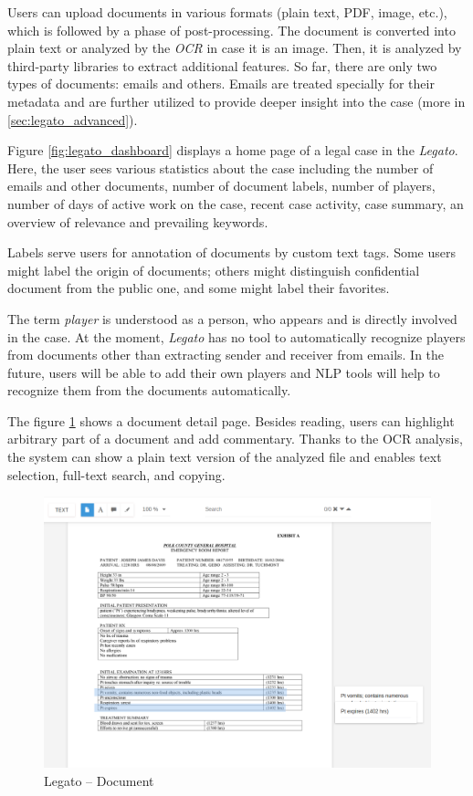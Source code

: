 \documentclass[
  digital, %
  notable,   %
  nolof,     %
  nolot,     %
]{fithesis3}
\begin{document}
Users can upload documents in various formats (plain text, PDF, image, etc.), which is followed by a phase of post-processing.
The document is converted into plain text or analyzed by the \textit{OCR} in case it is an image.
Then, it is analyzed by third-party libraries to extract additional features.
So far, there are only two types of documents: emails and others.
Emails are treated specially for their metadata and are further utilized to provide deeper insight into the case (more in \ref{sec:legato_advanced}).

Figure \ref{fig:legato_dashboard} displays a home page of a legal case in the \textit{Legato}.
Here, the user sees various statistics about the case including the number of emails and other documents, number of document labels, number of players, number of days of active work on the case, recent case activity, case summary, an overview of relevance and prevailing keywords.

Labels serve users for annotation of documents by custom text tags.
Some users might label the origin of documents; others might distinguish confidential document from the public one, and some might label their favorites.

The term \textit{player} is understood as a person, who appears and is directly involved in the case.
At the moment, \textit{Legato} has no tool to automatically recognize players from documents other than extracting sender and receiver from emails.
In the future, users will be able to add their own players and NLP tools will help to recognize them from the documents automatically.

The figure \ref{fig:legato_document} shows a document detail page.
Besides reading, users can highlight arbitrary part of a document and add commentary.
Thanks to the OCR analysis, the system can show a plain text version of the analyzed file and enables text selection, full-text search, and copying.

\begin{figure}[h]
\caption{Legato -- Document}
\label{fig:legato_document}
\includegraphics[width=\textwidth]{img/Legato-File}
\end{figure}
\end{document}
